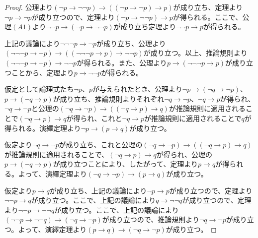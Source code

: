 \documentclass[a4paper]{jsarticle}
\begin{document}
\begin{proof}
公理より$(\neg p \rightarrow \neg\neg p) \rightarrow \left( (\neg p \rightarrow \neg p) \rightarrow p \right)$が成り立ち、定理より$\neg p \rightarrow \neg p$が成り立つので、定理より$(\neg p \rightarrow \neg\neg p) \rightarrow p$が得られる。ここで、公理$(A1)$より$\neg\neg p \rightarrow (\neg p \rightarrow \neg\neg p)$が成り立ち定理より$\neg\neg p \rightarrow p$が得られる。\par
上記の議論により$\neg\neg\neg p \rightarrow \neg p$が成り立ち、公理より$(\neg\neg\neg p \rightarrow \neg p) \rightarrow \left( (\neg\neg\neg p \rightarrow p) \rightarrow \neg\neg p \right)$が成り立つ。以上、推論規則より$(\neg\neg\neg p \rightarrow \neg p) \rightarrow \neg\neg p$が得られる。また、公理より$p \rightarrow (\neg\neg\neg p \rightarrow p)$が成り立つことから、定理より$p \rightarrow \neg\neg p$が得られる。\par
仮定として論理式たち$\neg p$、$p$が与えられたとき、公理より$\neg p \rightarrow (\neg q \rightarrow \neg p)$、$p \rightarrow (\neg q \rightarrow p)$が成り立ち、推論規則よりそれぞれ$\neg q \rightarrow \neg p$、$\neg q \rightarrow p$が得られ、$\neg q \rightarrow \neg p$と公理の$(\neg q \rightarrow \neg p) \rightarrow \left( (\neg q \rightarrow p) \rightarrow q \right)$が推論規則に適用されることで$(\neg q \rightarrow p) \rightarrow q$が得られ、これと$\neg q \rightarrow p$が推論規則に適用されることで$q$が得られる。演繹定理より$\neg p \rightarrow (p \rightarrow q)$が成り立つ。\par
仮定より$\neg q \rightarrow \neg p$が成り立ち、これと公理の$(\neg q \rightarrow \neg p) \rightarrow \left( (\neg q \rightarrow p) \rightarrow q \right)$が推論規則に適用されることで、$(\neg q \rightarrow p) \rightarrow q$が得られ、公理の$p \rightarrow (\neg q \rightarrow p)$が成り立つことにより、したがって、定理より$p \rightarrow q$が得られる。よって、演繹定理より$(\neg q \rightarrow \neg p) \rightarrow (p \rightarrow q)$が成り立つ。\par
仮定より$p \rightarrow q$が成り立ち、上記の議論により$\neg p \rightarrow p$が成り立つので、定理より$\neg\neg p \rightarrow q$が成り立つ。ここで、上記の議論により$q \rightarrow \neg\neg q$が成り立つので、定理より$\neg\neg p \rightarrow \neg\neg q$が成り立つ。ここで、上記の議論により$(\neg\neg p \rightarrow \neg\neg q) \rightarrow (\neg q \rightarrow \neg p)$が成り立つので、推論規則より$\neg q \rightarrow \neg p$が成り立つ。よって、演繹定理より$(p \rightarrow q) \rightarrow (\neg q \rightarrow \neg p)$が成り立つ。\par

\end{proof}
\end{document}
